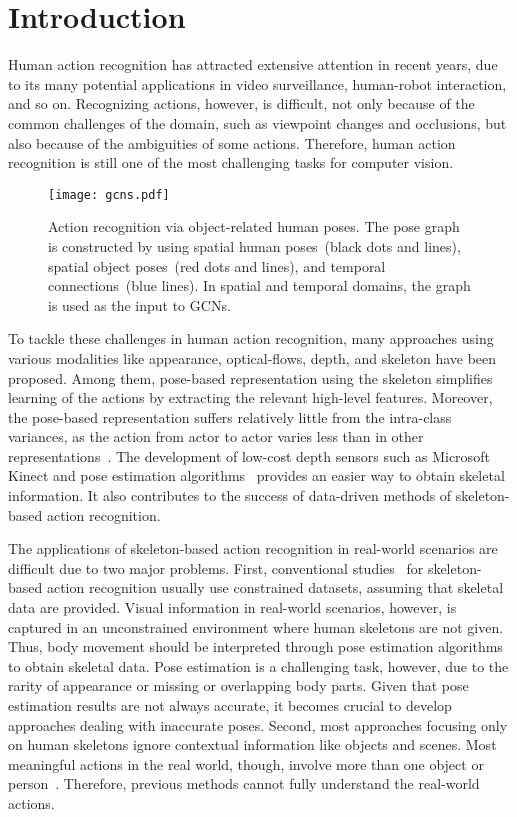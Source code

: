 \documentclass[10pt,twocolumn,letterpaper]{article}
\begin{document}
\section{Introduction}
\label{sec:intro}
Human action recognition has attracted extensive attention in recent years, due to its many potential applications in video surveillance, human-robot interaction, and so on. 
Recognizing actions, however, is difficult, not only because of the common challenges of the domain, such as viewpoint changes and occlusions, but also because of the ambiguities of some actions.
Therefore, human action recognition is still one of the most challenging tasks for computer vision.
\begin{figure}[t]
\begin{center}
   \texttt{[image: gcns.pdf]}
\end{center}
   \caption{ Action recognition via object-related human poses. 
The pose graph is constructed by using
spatial human poses~(black dots and lines), spatial object poses~(red dots and lines), and temporal connections~(blue lines). 
In spatial and temporal domains, the graph is used as the input to GCNs.
}
\label{fig:gcns}
\end{figure}
To tackle these challenges in human action recognition, many approaches using various modalities like appearance, optical-flows, depth, and skeleton have been proposed.
Among them, pose-based representation using the skeleton simplifies learning of the actions by extracting the relevant high-level features.
Moreover, the pose-based representation suffers relatively little from the intra-class variances, as the action from actor to actor varies less than in other representations~\cite{yao2012coupled}.
The development of low-cost depth sensors such as Microsoft Kinect and pose estimation algorithms~\cite{cao2017realtime,newell2016stacked,pavlakos2017coarse,shotton2011real} provides an easier way to obtain skeletal information.
It also contributes to the success of data-driven methods of skeleton-based action recognition.

The applications of skeleton-based action recognition in real-world scenarios are difficult due to two major problems.
First, conventional studies~\cite{kim2017interpretable, liu2016spatio,shahroudy2016ntu,stgcn2018aaai} for skeleton-based action recognition usually use constrained datasets, assuming that skeletal data are provided. 
Visual information in real-world scenarios, however, is captured in an unconstrained environment where human skeletons are not given.
Thus, body movement should be interpreted through pose estimation algorithms to obtain skeletal data.
Pose estimation is a challenging task, however, due to the rarity of appearance or missing or overlapping body parts.
Given that pose estimation results are not always accurate, it becomes crucial to develop approaches dealing with inaccurate poses. Second, most approaches focusing only on human skeletons ignore contextual information like objects and scenes. 
Most meaningful actions in the real world, though, involve more than one object or person~\cite{moeslund2006survey}.
Therefore, previous methods cannot fully understand the real-world actions.
\end{document}
